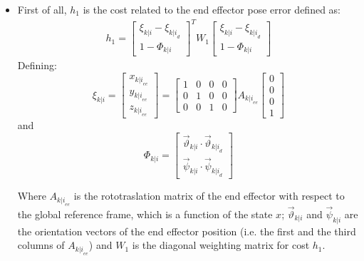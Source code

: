 \begin{itemize}

\item First of all, $h_1$ is the cost related to the end effector pose error defined as: 
\begin{equation}
\begin{split}
h_1 = \left[\begin{matrix} \xi_{k|i}-\xi_{{k|i}_{d}} \\ 1-\Phi_{k|i} \end{matrix}\right]^T W_1\left[\begin{matrix} \xi_{k|i}-\xi_{{k|i}_{d}} \\ 1-\Phi_{k|i}\end{matrix}\right]\textbf{}
\end{split}
\end{equation}
Defining:
\begin{equation} 
\xi_{k|i} = \left[ \begin{matrix} x_{{k|i}_{ee}} \\ y_{{k|i}_{ee}} \\ z_{{k|i}_{ee}} 
\end{matrix} \right] = \left[ \begin{matrix}
1 & 0 & 0 & 0 \\ 0 & 1 & 0 & 0 \\ 0 & 0 & 1 & 0
\end{matrix} \right]A_{{k|i}_{ee}}\left[ \begin{matrix}
0 \\ 0 \\ 0 \\ 1
\end{matrix} \right]
\end{equation} 
and
\begin{equation}
\Phi_{k|i}=\left[\begin{matrix}\vec{\vartheta}_{k|i}\cdot\vec{\vartheta}_{{k|i}_d}\\ \vec{\psi}_{k|i}\cdot\vec{\psi}_{{k|i}_d}
\end{matrix}\right] 
\end{equation}

Where $A_{{k|i}_{ee}}$ is the rototraslation matrix of the end effector with respect to the global reference frame, which is a function of the state $x$;  $\vec{\vartheta}_{k|i}$ and $\vec{\psi}_{k|i}$ are the orientation vectors of the end effector position (i.e. the first and the third columns of $A_{{k|i}_{ee}}$) and $W_1$ is the diagonal weighting matrix for cost $h_1$.


\end{itemize}
